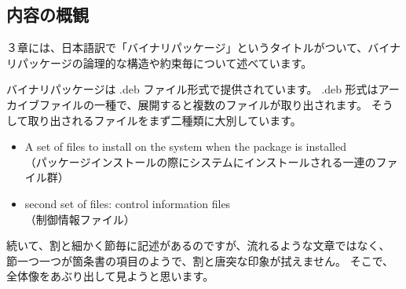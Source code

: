\documentclass[mingoth,a4paper]{jsarticle}
\begin{document}


\subsection{内容の概観}
３章には、日本語訳で「バイナリパッケージ」というタイトルがついて、バイナリパッケージの論理的な構造や約束毎について述べています。

バイナリパッケージは .deb ファイル形式で提供されています。
.deb 形式はアーカイブファイルの一種で、展開すると複数のファイルが取り出されます。
そうして取り出されるファイルをまず二種類に大別しています。

\begin{itemize}
\item A set of files to install on the system when the package is installed \\
  （パッケージインストールの際にシステムにインストールされる一連のファイル群）
\item second set of files: control information files \\
  （制御情報ファイル）
\end{itemize}

続いて、割と細かく節毎に記述があるのですが、流れるような文章ではなく、 節一つ一つが箇条書の項目のようで、割と唐突な印象が拭えません。
そこで、全体像をあぶり出して見ようと思います。
\end{document}
